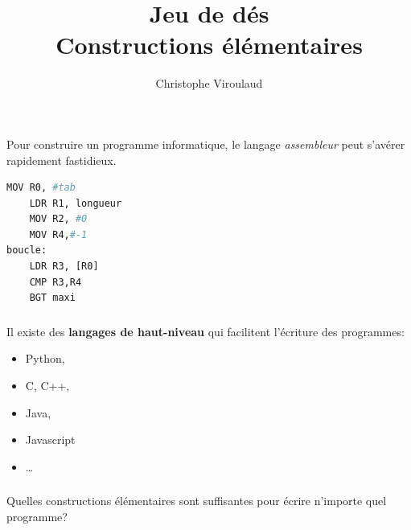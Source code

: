 \documentclass[svgnames,11pt]{beamer}
\author[]{Christophe Viroulaud}
\title{Jeu de dés\\ Constructions élémentaires}
\date{}
\institute{Première - NSI}
\begin{document}
\begin{frame}
    \titlepage
\end{frame}
\begin{frame}[fragile]
    \frametitle{}
    Pour construire un programme informatique, le langage \emph{assembleur} peut s'avérer rapidement fastidieux.
    \begin{center}
        \begin{lstlisting}[language=Python , basicstyle=\ttfamily\small, xleftmargin=1em, xrightmargin=1em]
    MOV R0, #tab      
    LDR R1, longueur  
    MOV R2, #0   
    MOV R4,#-1 
boucle:
    LDR R3, [R0]      
    CMP R3,R4     
    BGT maxi
\end{lstlisting}
        \label{CODE}
    \end{center}
\end{frame}
\begin{frame}
    \frametitle{}

    Il existe des \textbf{langages de haut-niveau} qui facilitent l'écriture des programmes:
    \begin{itemize}
        \item Python,
        \item C, C++,
        \item Java,
        \item Javascript
        \item \dots
    \end{itemize}
\end{frame}
\begin{frame}
    \frametitle{}
    \begin{framed}
        \begin{center}
            Quelles constructions élémentaires sont suffisantes pour écrire n'importe quel programme?
        \end{center}
    \end{framed}
\end{frame}
\end{document}

